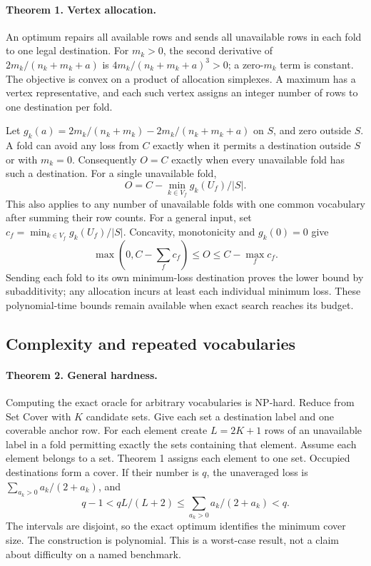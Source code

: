 \documentclass{article}
\begin{document}
\paragraph{Theorem 1. Vertex allocation.}
An optimum repairs all available rows and sends all unavailable rows in each fold to one legal destination. For \(m_k>0\), the second derivative of \(2m_k/(n_k+m_k+a)\) is \(4m_k/(n_k+m_k+a)^3>0\); a zero-\(m_k\) term is constant. The objective is convex on a product of allocation simplexes. A maximum has a vertex representative, and each such vertex assigns an integer number of rows to one destination per fold.

Let \(g_k(a)=2m_k/(n_k+m_k)-2m_k/(n_k+m_k+a)\) on \(S\), and zero outside \(S\). A fold can avoid any loss from \(C\) exactly when it permits a destination outside \(S\) or with \(m_k=0\). Consequently \(O=C\) exactly when every unavailable fold has such a destination. For a single unavailable fold,
\[
O=C-\min_{k\in V_f}g_k(U_f)/|S|.
\]
This also applies to any number of unavailable folds with one common vocabulary after summing their row counts. For a general input, set \(c_f=\min_{k\in V_f}g_k(U_f)/|S|\). Concavity, monotonicity and \(g_k(0)=0\) give
\[
\max(0,C-\sum_fc_f)\le O\le C-\max_fc_f.
\]
Sending each fold to its own minimum-loss destination proves the lower bound by subadditivity; any allocation incurs at least each individual minimum loss. These polynomial-time bounds remain available when exact search reaches its budget.

\subsection{Complexity and repeated vocabularies}
\paragraph{Theorem 2. General hardness.}
Computing the exact oracle for arbitrary vocabularies is NP-hard. Reduce from Set Cover with \(K\) candidate sets. Give each set a destination label and one coverable anchor row. For each element create \(L=2K+1\) rows of an unavailable label in a fold permitting exactly the sets containing that element. Assume each element belongs to a set. Theorem 1 assigns each element to one set. Occupied destinations form a cover. If their number is \(q\), the unaveraged loss is \(\sum_{a_k>0}a_k/(2+a_k)\), and
\[
q-1<qL/(L+2)\le\sum_{a_k>0}a_k/(2+a_k)<q.
\]
The intervals are disjoint, so the exact optimum identifies the minimum cover size. The construction is polynomial. This is a worst-case result, not a claim about difficulty on a named benchmark.
\end{document}

